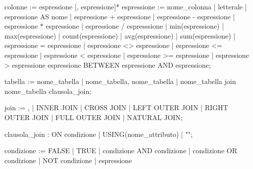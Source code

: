\documentclass[italian,a4paper]{article}
\newenvironment{Shaded}{}{}
\newcommand{\NormalTok}[1]{#1}
\begin{document}
\begin{Shaded}
\begin{Highlighting}[]
\NormalTok{colonne := espressione [, espressione]*}
\NormalTok{espressione := nome\_colonna |}
\NormalTok{               letterale |}
\NormalTok{               espressione AS nome |}
\NormalTok{               espressione + espressione |}
\NormalTok{               espressione {-} espressione |}
\NormalTok{               espressione * espressione |}
\NormalTok{               espressione / espresssione |}
\NormalTok{               min(espressione) |}
\NormalTok{               max(espressione) |}
\NormalTok{               count(espressione) |}
\NormalTok{               avg(espressione) |}
\NormalTok{               sum(espressione) |}
\NormalTok{               espressione = espressione |}
\NormalTok{               espressione \textless{}\textgreater{} espressione |}
\NormalTok{               espressione \textless{}= espressione |}
\NormalTok{               espressione \textless{} espressione |}
\NormalTok{               espressione \textgreater{}= espressione |}
\NormalTok{               espressione \textgreater{} espressione}
\NormalTok{               espressione BETWEEN espressione AND espressione;}

\NormalTok{tabella := nome\_tabella |}
\NormalTok{           nome\_tabella, nome\_tabella |}
\NormalTok{           nome\_tabella join nome\_tabella clausola\_join;}

\NormalTok{join := , |}
\NormalTok{        INNER JOIN |}
\NormalTok{        CROSS JOIN |}
\NormalTok{        LEFT OUTER JOIN |}
\NormalTok{        RIGHT OUTER JOIN |}
\NormalTok{        FULL OUTER JOIN |}
\NormalTok{        NATURAL JOIN;}

\NormalTok{clausola\_join : ON condizione |}
\NormalTok{                USING(nome\_attributo) |}
\NormalTok{                "";}

\NormalTok{condizione := FALSE | TRUE |}
\NormalTok{              condizione AND condizione |}
\NormalTok{              condizione OR condizione |}
\NormalTok{              NOT condizione |}
\NormalTok{              espressione}
\end{Highlighting}
\end{Shaded}
\end{document}
